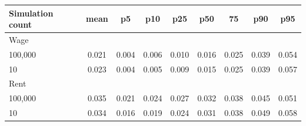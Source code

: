 \begin{tabular}{lcccccccc}
\toprule Simulation count & mean & p5 & p10 & p25 & p50 & 75 & p90 & p95\\
\midrule
Wage \\
 100,000 & 0.021 & 0.004 & 0.006 & 0.010 & 0.016 & 0.025 & 0.039 & 0.054\\
10 & 0.023 & 0.004 & 0.005 & 0.009 & 0.015 & 0.025 & 0.039 & 0.057\\
\midrule
Rent \\
100,000 & 0.035 & 0.021 & 0.024 & 0.027 & 0.032 & 0.038 & 0.045 & 0.051\\
10 & 0.034 & 0.016 & 0.019 & 0.024 & 0.031 & 0.038 & 0.049 & 0.058\\
\bottomrule \end{tabular}
